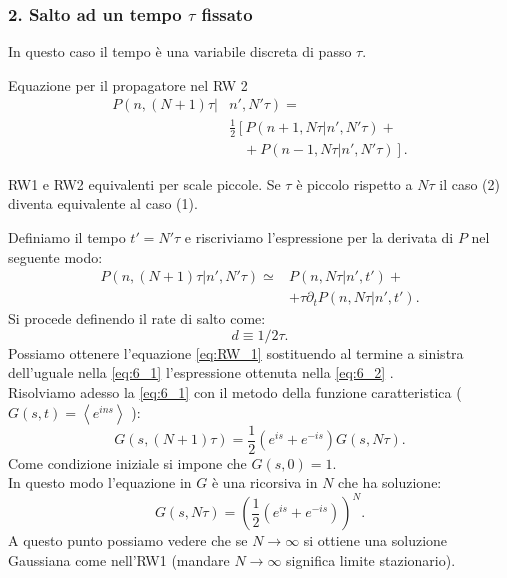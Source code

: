 \subsubsection{2. Salto ad un tempo $\tau$ fissato}%
\label{subsub:2. Salto ad un tempo tau fissato}
In questo caso il tempo è una variabile discreta di passo $\tau$.
\begin{bluebox}{Equazione per il propagatore nel RW 2}
\begin{equation}
\begin{aligned}
    P\left(n,(N+1) \tau|\right.&\left.n',N'\tau\right)= \\
			       &\frac{1}{2}\left[P\left(n+1,N\tau|n',N'\tau\right)\right. + \\
			       & \quad + \left.  P\left(n-1,N\tau|n',N'\tau\right)\right] \label{eq:6_1}
.\end{aligned}
\end{equation}
    
\end{bluebox}
\noindent
\begin{greenbox}{RW1 e RW2 equivalenti per scale piccole.}
 Se $\tau$ è piccolo rispetto a $N\tau$ il caso (2) diventa equivalente al caso (1).   
\end{greenbox}
\noindent
Definiamo il tempo $t' = N'\tau$ e riscriviamo l'espressione per la derivata di $P$ nel seguente modo:
\begin{equation}
\begin{aligned}
    P\left(n,(N+1) \tau|n',N'\tau\right)\simeq & P\left(n,N\tau|n',t'\right) + \\
					       & + \tau\partial_{t}P\left(n,N\tau|n',t'\right) \label{eq:6_2}
.\end{aligned}
\end{equation}
Si procede definendo il rate di salto come: 
\[
 d \equiv 1 /2\tau   
.\] 
Possiamo ottenere l'equazione \ref{eq:RW_1} sostituendo al termine a sinistra dell'uguale nella \ref{eq:6_1} l'espressione ottenuta nella \ref{eq:6_2} .\\
Risolviamo adesso la \ref{eq:6_1} con il metodo della funzione caratteristica ($G(s,t) = \left<e^{ins}\right>$ ):
\[
    G(s, (N+1)\tau) = \frac{1}{2}\left(e^{is}+ e^{-is}\right)G(s,N\tau) 
.\] 
Come condizione iniziale si impone che $G(s,0) = 1$.\\
In questo modo l'equazione in $G$ è una ricorsiva in $N$ che ha soluzione:
\[
    G(s,N\tau) = \left(\frac{1}{2}\left(e^{is}+e^{-is}\right)\right)^{N}
.\] 
A questo punto possiamo vedere che se $N\to \infty$ si ottiene una soluzione Gaussiana come nell'RW1 (mandare $N\to \infty$ significa limite stazionario).
